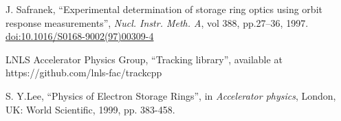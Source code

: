 \documentclass[a4paper,
               keeplastbox,   %
               ]{jacow}
\begin{document}
\begin{thebibliography}{14}
	 J. Safranek,
		\textquotedblleft{Experimental determination of storage ring optics using orbit response measurements}\textquotedblright,
		\emph{Nucl.  Instr. Meth. A}, vol 388, pp.27--36, 1997.
        \url{doi:10.1016/S0168-9002(97)00309-4}

    LNLS Accelerator Physics Group,
    \textquotedblleft{Tracking library}\textquotedblright,
    available at https://github.com/lnls-fac/trackcpp
        
    S. Y.Lee,
    \textquotedblleft{Physics of Electron Storage Rings}\textquotedblright,
    in \emph{Accelerator physics}, London, UK: World Scientific, 1999, pp. 383-458.

 






        
 
       

 
    

\end{thebibliography}
\end{document}
